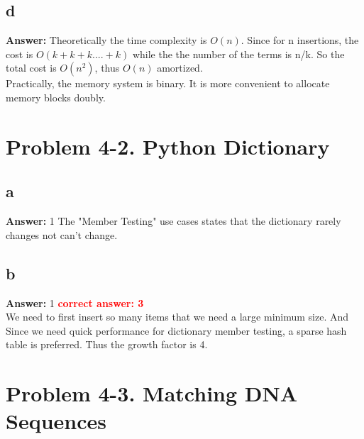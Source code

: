 \documentclass[12pt]{article}%
\newcommand{\runningTime}[1]{$O(#1)$}
\newcommand{\correctAnswer}[1]{\textbf{\textcolor{red}{correct answer: #1  \\}}}
\begin{document}
\subsection{d}
\textbf{Answer:}
Theoretically the time complexity is \runningTime{n}. Since for n insertions, the cost is \runningTime{ k + k + k .... + k} while the the number of the terms is n/k. So the total cost is \runningTime{n^2}, thus \runningTime{n} amortized. \\
Practically, the memory system is binary. It is more convenient to allocate memory blocks doubly.


\section{Problem 4-2. Python Dictionary}
	\subsection{a}
	\textbf{Answer:} 1
	The "Member Testing" use cases states that the dictionary rarely changes not can't change.
	\subsection{b}
	\textbf{Answer:} 1 \correctAnswer{3}
	We need to first insert so many items that we need  a large minimum size. And Since we need quick performance for dictionary member testing, a sparse hash table is preferred. Thus the growth factor is 4.


\section{Problem 4-3. Matching DNA Sequences}
\end{document}

